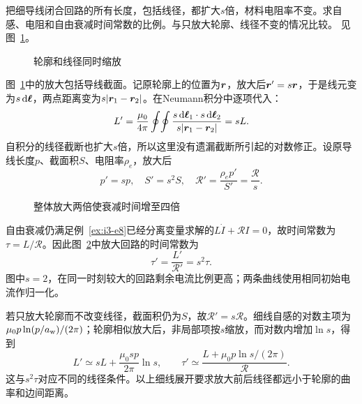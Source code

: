 \begin{exercise}[整体相似放大的电阻回路]\label{ex:i3-h5}
把细导线闭合回路的所有长度，包括线径，都扩大$s$倍，材料电阻率不变。求自感、电阻和自由衰减时间常数的比例。与只放大轮廓、线径不变的情况比较。 见图~\ref{fig:i3-h5-q}。
\end{exercise}

\begin{figure}[H]\centering
{}
\caption{轮廓和线径同时缩放}\label{fig:i3-h5-q}
\end{figure}
\begin{solution}
图~\ref{fig:i3-h5-q}中的放大包括导线截面。记原轮廓上的位置为$\bm{r}$，放大后$\bm{r}'=s\bm{r}$，于是线元变为$s\mathop{}\!\mathrm d\bm{\ell}$，两点距离变为$s|\bm{r}_1-\bm{r}_2|$。在Neumann积分中逐项代入：
\[
L'=\frac{\mu_0}{4\pi}\oint\!\oint
\frac{s\mathop{}\!\mathrm d\bm{\ell}_1\cdot s\mathop{}\!\mathrm d\bm{\ell}_2}
{s|\bm{r}_1-\bm{r}_2|}=sL.
\]
自积分的线径截断也扩大$s$倍，所以这里没有遗漏截断所引起的对数修正。设原导线长度$p$、截面积$S$、电阻率$\rho_e$，放大后
\[
p'=sp,\quad S'=s^2S,\quad
\mathcal R'=\frac{\rho_ep'}{S'}=\frac{\mathcal R}{s}.
\]
\begin{figure}[H]\centering
{}
\caption{整体放大两倍使衰减时间增至四倍}\label{fig:i3-h5-s}
\end{figure}
自由衰减仍满足例~\ref{ex:i3-e8}已经分离变量求解的$L\dot I+\mathcal RI=0$，故时间常数为$\tau=L/\mathcal R$。因此图~\ref{fig:i3-h5-s}中放大回路的时间常数为
\[
\boxed{\tau'=\frac{L'}{\mathcal R'}=s^2\tau}.
\]
图中$s=2$，在同一时刻较大的回路剩余电流比例更高；两条曲线使用相同初始电流作归一化。

若只放大轮廓而不改变线径，截面积仍为$S$，故$\mathcal R'=s\mathcal R$。细线自感的对数主项为$\mu_0p\ln(p/a_{\rm w})/(2\pi)$；轮廓相似放大后，非局部项按$s$缩放，而对数内增加$\ln s$，得到
\[
L'\simeq sL+\frac{\mu_0sp}{2\pi}\ln s,\qquad
\tau'\simeq\frac{L+\mu_0p\ln s/(2\pi)}{\mathcal R}.
\]
这与$s^2\tau$对应不同的线径条件。以上细线展开要求放大前后线径都远小于轮廓的曲率和边间距离。
\end{solution}

